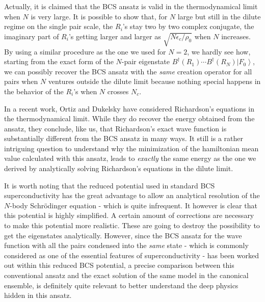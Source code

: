 \documentclass[epj]{svjour}
\begin{document}
Actually, it is claimed that the BCS ansatz is valid in the thermodynamical
limit when $N$ is very large. It is possible to show that, for $N$ large but still in the dilute regime on the single pair scale, the $R_i$'s stay two by two complex conjugate, the imaginary part of $R_i $'s getting larger and larger as $\sqrt{N\epsilon_c/\rho_0}$ when $N$ increases. By using a similar procedure as the one we used for $N=2$, we hardly see how, 
starting from the exact form of the $N$-pair eigenstate $B^{\dagger}(R_1)\cdots{}B^{\dagger}(R_N)\left|F_0\right>  $, we can possibly recover the BCS ansatz with the \emph{same} 
creation operator for all  pairs when $N$ ventures outside the dilute limit because nothing special happens in the behavior of the $R_i$'s when $N$ crosses $N_c$. 

In a recent work, Ortiz and Dukelsky\cite{crossoverRich} have  considered Richardson's equations in the thermodynamical limit. While they do recover the energy obtained from the ansatz, they conclude, like us, that Richardson's exact wave function is substantially different from the BCS ansatz in many ways.    It  still is a rather intriguing question to understand why the minimization of the hamiltonian mean value calculated with this ansatz, leads to \emph{exactly} the same energy as the one we derived by analytically solving Richardson's equations in the dilute limit.

It is worth noting that the reduced potential used in standard BCS superconductivity has the great advantage to allow an analytical resolution of the $N$-body Schr\"{o}dinger equation - which is quite infrequent. It however is clear that this potential is highly simplified. A certain amount of corrections are necessary to make this potential more realistic. These are going to destroy the possibility to get the eigenstates analytically. However, since the BCS ansatz for the wave function with all the pairs condensed into the \emph{same} state - which is commonly considered as one of the essential features of superconductivity - has been worked out within this reduced BCS potential, a precise comparison between this conventional ansatz and the exact solution of the same model in the canonical ensemble, is definitely quite relevant to better understand the deep physics hidden in this ansatz.
\end{document}
